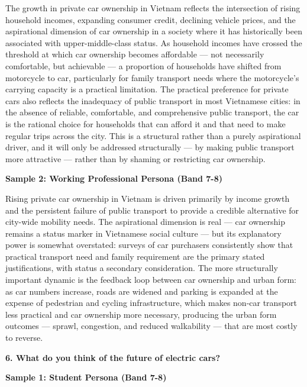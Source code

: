 The growth in private car ownership in Vietnam reflects the intersection of rising household incomes, expanding consumer credit, declining vehicle prices, and the aspirational dimension of car ownership in a society where it has historically been associated with upper-middle-class status. As household incomes have crossed the threshold at which car ownership becomes affordable — not necessarily comfortable, but achievable — a proportion of households have shifted from motorcycle to car, particularly for family transport needs where the motorcycle's carrying capacity is a practical limitation. The practical preference for private cars also reflects the inadequacy of public transport in most Vietnamese cities: in the absence of reliable, comfortable, and comprehensive public transport, the car is the rational choice for households that can afford it and that need to make regular trips across the city. This is a structural rather than a purely aspirational driver, and it will only be addressed structurally — by making public transport more attractive — rather than by shaming or restricting car ownership.

\textbf{Sample 2: Working Professional Persona (Band 7-8)}

Rising private car ownership in Vietnam is driven primarily by income growth and the persistent failure of public transport to provide a credible alternative for city-wide mobility needs. The aspirational dimension is real — car ownership remains a status marker in Vietnamese social culture — but its explanatory power is somewhat overstated: surveys of car purchasers consistently show that practical transport need and family requirement are the primary stated justifications, with status a secondary consideration. The more structurally important dynamic is the feedback loop between car ownership and urban form: as car numbers increase, roads are widened and parking is expanded at the expense of pedestrian and cycling infrastructure, which makes non-car transport less practical and car ownership more necessary, producing the urban form outcomes — sprawl, congestion, and reduced walkability — that are most costly to reverse.

\separator

\begin{ieltsquestion}
\textbf{6. What do you think of the future of electric cars?}
\end{ieltsquestion}
\textbf{Sample 1: Student Persona (Band 7-8)}

